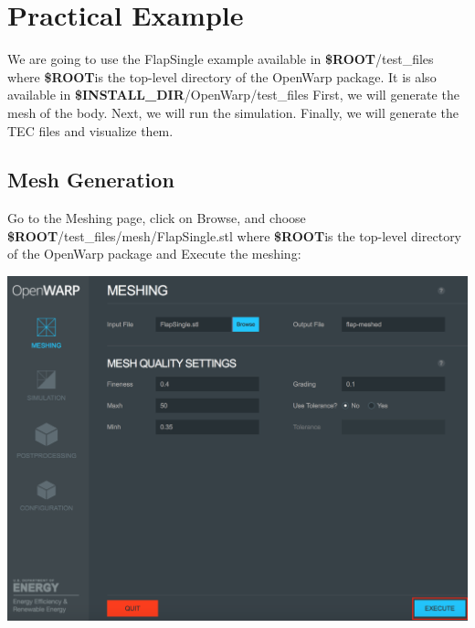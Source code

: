 \documentclass[12pt]{article}
\newcommand{\ROOT}{{\textbf{\$ROOT}}}
\newcommand{\INSTALLDIR}{{\textbf{\$INSTALL{\_}DIR}}}
\begin{document}
\section{Practical Example}

We are going to use the FlapSingle example available in \ROOT/test_files where \ROOT is the top-level directory of the OpenWarp package. It is also available in \INSTALLDIR/OpenWarp/test_files
First, we will generate the mesh of the body. Next, we will run the simulation. Finally, we will generate the TEC files and visualize them.

\subsection{Mesh Generation}
Go to the Meshing page, click on Browse, and choose \ROOT/test_files/mesh/FlapSingle.stl where \ROOT is the top-level directory of the OpenWarp package and Execute the meshing:

\vspace{\abovedisplayskip}
\begin{minipage}{\linewidth}
	\centering
	\includegraphics[scale=0.5]{img/42}
\end{minipage}
\vspace{\belowdisplayskip}



\end{document}
